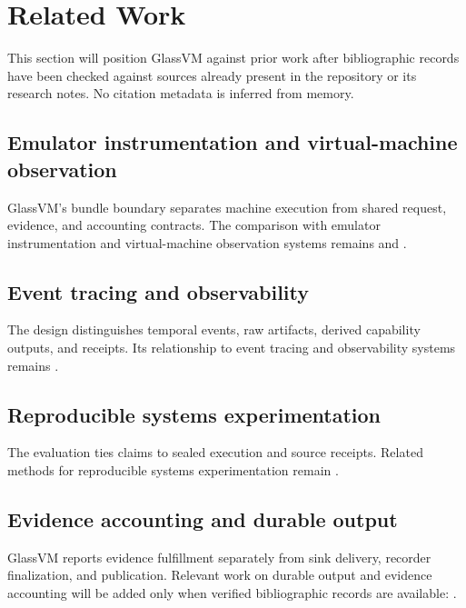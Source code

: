 \section{Related Work}

This section will position GlassVM against prior work after bibliographic
records have been checked against sources already present in the repository
or its research notes. No citation metadata is inferred from memory.

\subsection{Emulator instrumentation and virtual-machine observation}

GlassVM's bundle boundary separates machine execution from shared request,
evidence, and accounting contracts. The comparison with emulator
instrumentation and virtual-machine observation systems remains
\textbf{\texttt{}} and
\textbf{\texttt{}}.

\subsection{Event tracing and observability}

The design distinguishes temporal events, raw artifacts, derived capability
outputs, and receipts. Its relationship to event tracing and observability
systems remains
\textbf{\texttt{}}.

\subsection{Reproducible systems experimentation}

The evaluation ties claims to sealed execution and source receipts. Related
methods for reproducible systems experimentation remain
\textbf{\texttt{}}.

\subsection{Evidence accounting and durable output}

GlassVM reports evidence fulfillment separately from sink delivery, recorder
finalization, and publication. Relevant work on durable output and evidence
accounting will be added only when verified bibliographic records are
available: \textbf{\texttt{}}.
